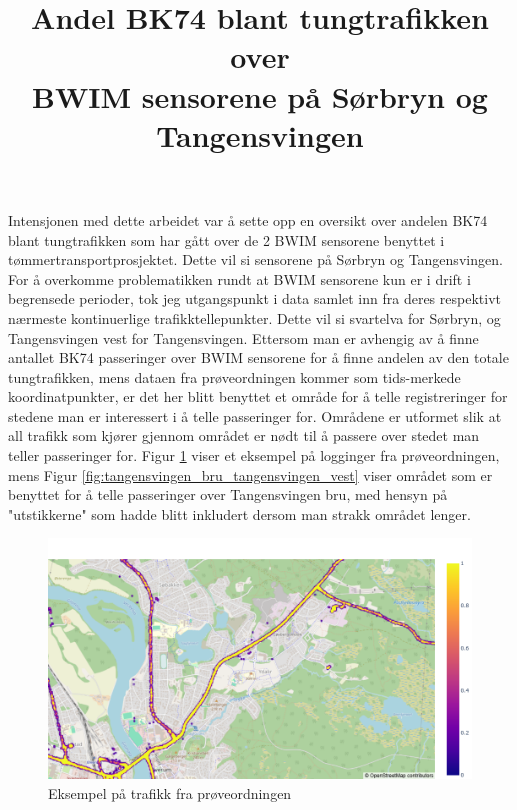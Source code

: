\documentclass{article}
\begin{document}
\title{Andel BK74 blant tungtrafikken over\\BWIM sensorene på Sørbryn og Tangensvingen}
\author{}
\maketitle

\newpage


Intensjonen med dette arbeidet var å sette opp en oversikt over andelen BK74 blant tungtrafikken som har gått
over de 2 BWIM sensorene benyttet i tømmertransportprosjektet. Dette vil si sensorene på Sørbryn og Tangensvingen.
For å overkomme problematikken rundt at BWIM sensorene kun er i drift i begrensede perioder, tok jeg utgangspunkt i
data samlet inn fra deres respektivt nærmeste kontinuerlige trafikktellepunkter. Dette vil si svartelva for Sørbryn,
og Tangensvingen vest for Tangensvingen. Ettersom man er avhengig av å finne antallet BK74 passeringer over BWIM sensorene
for å finne andelen av den totale tungtrafikken, mens dataen fra prøveordningen kommer som tids-merkede koordinatpunkter, er det
her blitt benyttet et område for å telle registreringer for stedene man er interessert i å telle passeringer for. Områdene er utformet slik
at all trafikk som kjører gjennom området er nødt til å passere over stedet man teller passeringer for.
Figur \ref{fig:heatmap} viser et eksempel på logginger fra prøveordningen, mens
Figur \ref{fig:tangensvingen_bru_tangensvingen_vest} viser området som er benyttet for å telle passeringer over Tangensvingen bru,
med hensyn på "utstikkerne" som hadde blitt inkludert dersom man strakk området lenger.

\begin{figure}[H]
    \centering
    \includegraphics[width=1\textwidth]{./figures/heatmap.png}
    \caption{Eksempel på trafikk fra prøveordningen}
    \label{fig:heatmap}
\end{figure}
\end{document}
